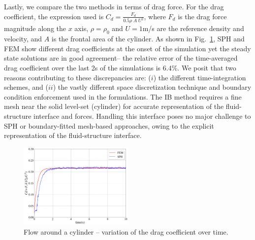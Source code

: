 \documentclass[final,3p,times]{elsarticle}
\begin{document}
Lastly, we compare the two methods in terms of drag force. For the drag coefficient, the expression used is $C_d=\frac{F_d}{0.5\rho\;A\; U^2}$, where $F_d$ is the drag force magnitude along the $x$ axis, $\rho=\rho_0$ and $U=1$\si{m/s} are the reference density and velocity, and $A$ is the frontal area of the cylinder.  As shown in Fig.~\ref{fig:FoC}, SPH and FEM show different drag coefficients at the onset of the simulation yet the steady state solutions are in good agreement-- the relative error of the time-averaged drag coefficient over the last 2\si{s} of the simulations is $6.4$\%. We posit that two reasons contributing to these discrepancies are: ($i$) the different time-integration schemes, and ($ii$) the vastly different space discretization technique and boundary condition enforcement used in the formulations. The IB method requires a fine mesh near the solid level-set (cylinder) for accurate representation of the fluid-structure interface and forces. Handling this interface poses no major challenge to SPH or boundary-fitted mesh-based approaches, owing to the explicit representation of the fluid-structure interface.

\begin{figure}[H]
	\begin{center}
        \vspace{-10pt}
		\includegraphics[width=0.5\textwidth]{Images/Figure_flow_around_cylinder.png}
	\end{center}
	\caption{Flow around a cylinder -- variation of the drag coefficient over time.}
	\label{fig:FoC}
\end{figure}
\end{document}
